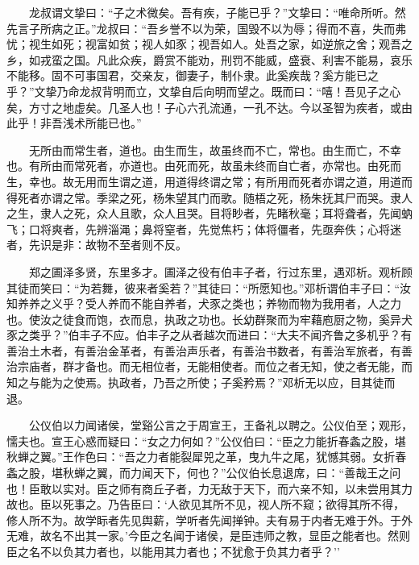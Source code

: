 　　龙叔谓文挚曰：``子之术微矣。吾有疾，子能已乎？''文挚曰：``唯命所听。然先言子所病之正。''龙叔曰：``吾乡誉不以为荣，国毁不以为辱；得而不喜，失而弗忧；视生如死；视富如贫；视人如豕；视吾如人。处吾之家，如逆旅之舍；观吾之乡，如戎蛮之国。凡此众疾，爵赏不能劝，刑罚不能威，盛衰、利害不能易，哀乐不能移。固不可事国君，交亲友，御妻子，制仆隶。此奚疾哉？奚方能已之乎？''文挚乃命龙叔背明而立，文挚自后向明而望之。既而曰：``嘻！吾见子之心矣，方寸之地虚矣。几圣人也！子心六孔流通，一孔不达。今以圣智为疾者，或由此乎！非吾浅术所能已也。''

　　无所由而常生者，道也。由生而生，故虽终而不亡，常也。由生而亡，不幸也。有所由而常死者，亦道也。由死而死，故虽未终而自亡者，亦常也。由死而生，幸也。故无用而生谓之道，用道得终谓之常；有所用而死者亦谓之道，用道而得死者亦谓之常。季梁之死，杨朱望其门而歌。随梧之死，杨朱抚其尸而哭。隶人之生，隶人之死，众人且歌，众人且哭。目将眇者，先睹秋毫；耳将聋者，先闻蚋飞；口将爽者，先辨淄渑；鼻将窒者，先觉焦朽；体将僵者，先亟奔佚；心将迷者，先识是非：故物不至者则不反。

　　郑之圃泽多贤，东里多才。圃泽之役有伯丰子者，行过东里，遇邓析。观析顾其徒而笑曰：``为若舞，彼来者奚若？''其徒曰：``所愿知也。''邓析谓伯丰子曰：``汝知养养之义乎？受人养而不能自养者，犬豕之类也；养物而物为我用者，人之力也。使汝之徒食而饱，衣而息，执政之功也。长幼群聚而为牢藉庖厨之物，奚异犬豕之类乎？''伯丰子不应。伯丰子之从者越次而进曰：``大夫不闻齐鲁之多机乎？有善治土木者，有善治金革者，有善治声乐者，有善治书数者，有善治军旅者，有善治宗庙者，群才备也。而无相位者，无能相使者。而位之者无知，使之者无能，而知之与能为之使焉。执政者，乃吾之所使；子奚矜焉？''邓析无以应，目其徒而退。

　　公仪伯以力闻诸侯，堂谿公言之于周宣王，王备礼以聘之。公仪伯至；观形，懦夫也。宣王心惑而疑曰：``女之力何如？''公仪伯曰：``臣之力能折春螽之股，堪秋蝉之翼。''王作色曰：``吾之力者能裂犀兕之革，曳九牛之尾，犹憾其弱。女折春螽之股，堪秋蝉之翼，而力闻天下，何也？''公仪伯长息退席，曰：``善哉王之问也！臣敢以实对。臣之师有商丘子者，力无敌于天下，而六亲不知，以未尝用其力故也。臣以死事之。乃告臣曰：`人欲见其所不见，视人所不窥；欲得其所不得，修人所不为。故学眎者先见舆薪，学听者先闻掸钟。夫有易于内者无难于外。于外无难，故名不出其一家。'今臣之名闻于诸侯，是臣违师之教，显臣之能者也。然则臣之名不以负其力者也，以能用其力者也；不犹愈于负其力者乎？''

